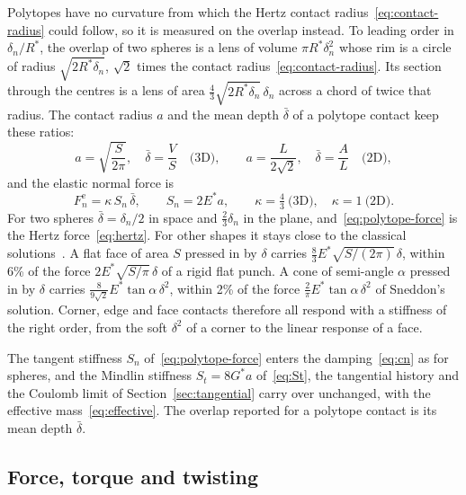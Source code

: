 Polytopes have no curvature from which the Hertz contact radius~\eqref{eq:contact-radius} could follow, so it is measured on the overlap instead.
To leading order in $\delta_{n}/R^{*}$, the overlap of two spheres is a lens of volume $\pi R^{*}\delta_{n}^{2}$ whose rim is a circle of radius $\sqrt{2R^{*}\delta_{n}}$, $\sqrt{2}$ times the contact radius~\eqref{eq:contact-radius}.
Its section through the centres is a lens of area $\tfrac{4}{3}\sqrt{2R^{*}\delta_{n}}\,\delta_{n}$ across a chord of twice that radius.
The contact radius $a$ and the mean depth $\bar{\delta}$ of a polytope contact keep these ratios:
\begin{equation}
  a = \sqrt{\frac{S}{2\pi}},\quad \bar{\delta} = \frac{V}{S}\quad\text{(3D)},
  \qquad
  a = \frac{L}{2\sqrt{2}},\quad \bar{\delta} = \frac{A}{L}\quad\text{(2D)},
  \label{eq:polytope-radius}
\end{equation}
and the elastic normal force is
\begin{equation}
  \boxed{\;
  F_{n}^{\mathrm{e}} = \kappa\,S_{n}\,\bar{\delta},
  \qquad S_{n}=2E^{*}a,
  \qquad \kappa = \tfrac{4}{3}\ \text{(3D)},\quad \kappa=1\ \text{(2D)}.\;}
  \label{eq:polytope-force}
\end{equation}
For two spheres $\bar{\delta}=\delta_{n}/2$ in space and $\tfrac{2}{3}\delta_{n}$ in the plane, and~\eqref{eq:polytope-force} is the Hertz force~\eqref{eq:hertz}.
For other shapes it stays close to the classical solutions~\cite{johnson1985}.
A flat face of area $S$ pressed in by $\delta$ carries $\tfrac{8}{3}E^{*}\sqrt{S/(2\pi)}\,\delta$, within \num{6}\% of the force $2E^{*}\sqrt{S/\pi}\,\delta$ of a rigid flat punch.
A cone of semi-angle $\alpha$ pressed in by $\delta$ carries $\tfrac{8}{9\sqrt{2}}E^{*}\tan\alpha\,\delta^{2}$, within \num{2}\% of the force $\tfrac{2}{\pi}E^{*}\tan\alpha\,\delta^{2}$ of Sneddon's solution.
Corner, edge and face contacts therefore all respond with a stiffness of the right order, from the soft $\delta^{2}$ of a corner to the linear response of a face.

The tangent stiffness $S_{n}$ of~\eqref{eq:polytope-force} enters the damping~\eqref{eq:cn} as for spheres, and the Mindlin stiffness $S_{t}=8G^{*}a$ of~\eqref{eq:St}, the tangential history and the Coulomb limit of Section~\ref{sec:tangential} carry over unchanged, with the effective mass~\eqref{eq:effective}.
The overlap reported for a polytope contact is its mean depth $\bar{\delta}$.

\subsection{Force, torque and twisting}

